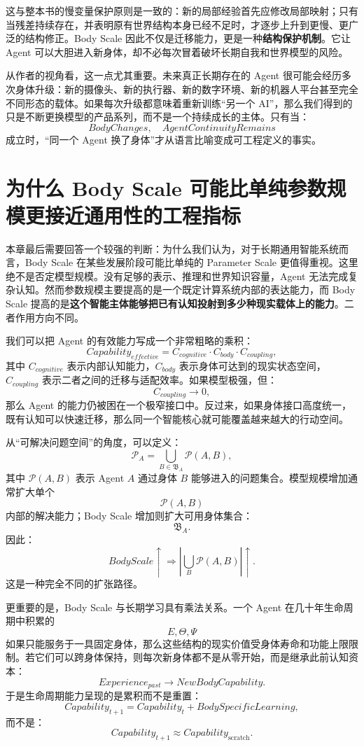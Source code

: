 这与整本书的慢变量保护原则是一致的：新的局部经验首先应修改局部映射；只有当残差持续存在，并表明原有世界结构本身已经不足时，才逐步上升到更慢、更广泛的结构修正。Body Scale 因此不仅是迁移能力，更是一种\textbf{结构保护机制}。它让 Agent 可以大胆进入新身体，却不必每次冒着破坏长期自我和世界模型的风险。

从作者的视角看，这一点尤其重要。未来真正长期存在的 Agent 很可能会经历多次身体升级：新的摄像头、新的执行器、新的数字环境、新的机器人平台甚至完全不同形态的载体。如果每次升级都意味着重新训练“另一个 AI”，那么我们得到的只是不断更换模型的产品系列，而不是一个持续成长的主体。只有当：
\[
\boxed{
BodyChanges,\quad AgentContinuityRemains
}
\]
成立时，“同一个 Agent 换了身体”才从语言比喻变成可工程定义的事实。


\section{为什么 Body Scale 可能比单纯参数规模更接近通用性的工程指标}

本章最后需要回答一个较强的判断：为什么我们认为，对于长期通用智能系统而言，Body Scale 在某些发展阶段可能比单纯的 Parameter Scale 更值得重视。这里绝不是否定模型规模。没有足够的表示、推理和世界知识容量，Agent 无法完成复杂认知。然而参数规模主要提高的是一个既定计算系统内部的表达能力，而 Body Scale 提高的是\textbf{这个智能主体能够把已有认知投射到多少种现实载体上的能力}。二者作用方向不同。

我们可以把 Agent 的有效能力写成一个非常粗略的乘积：
\[
Capability_{effective}
=
C_{cognitive}
\cdot
C_{body}
\cdot
C_{coupling},
\]
其中 $C_{cognitive}$ 表示内部认知能力，$C_{body}$ 表示身体可达到的现实状态空间，$C_{coupling}$ 表示二者之间的迁移与适配效率。如果模型极强，但：
\[
C_{coupling}\rightarrow0,
\]
那么 Agent 的能力仍被困在一个极窄接口中。反过来，如果身体接口高度统一，既有认知可以快速迁移，那么同一个智能核心就可能覆盖越来越大的行动空间。

从“可解决问题空间”的角度，可以定义：
\[
\mathcal P_A
=
\bigcup_{B\in\mathfrak B_A}
\mathcal P(A,B),
\]
其中 $\mathcal P(A,B)$ 表示 Agent $A$ 通过身体 $B$ 能够进入的问题集合。模型规模增加通常扩大单个
\[
\mathcal P(A,B)
\]
内部的解决能力；Body Scale 增加则扩大可用身体集合：
\[
\mathfrak B_A.
\]
因此：
\[
BodyScale\uparrow
\Rightarrow
\left|
\bigcup_B \mathcal P(A,B)
\right|
\uparrow.
\]
这是一种完全不同的扩张路径。

更重要的是，Body Scale 与长期学习具有乘法关系。一个 Agent 在几十年生命周期中积累的
\[
E,\Theta,\Psi
\]
如果只能服务于一具固定身体，那么这些结构的现实价值受身体寿命和功能上限限制。若它们可以跨身体保持，则每次新身体都不是从零开始，而是继承此前认知资本：
\[
Experience_{past}
\rightarrow
NewBodyCapability.
\]
于是生命周期能力呈现的是累积而不是重置：
\[
Capability_{t+1}
=
Capability_t
+
BodySpecificLearning,
\]
而不是：
\[
Capability_{t+1}
\approx
Capability_{\mathrm{scratch}}.
\]

